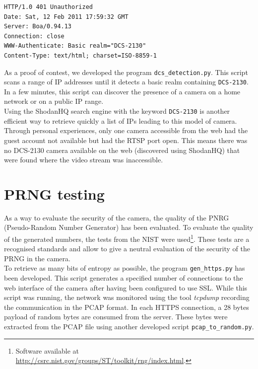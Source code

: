 \begin{verbatim}
HTTP/1.0 401 Unauthorized
Date: Sat, 12 Feb 2011 17:59:32 GMT
Server: Boa/0.94.13
Connection: close
WWW-Authenticate: Basic realm="DCS-2130"
Content-Type: text/html; charset=ISO-8859-1
\end{verbatim}

As a proof of contest, we developed the program \texttt{dcs\_detection.py}.
This script scans a range of IP addresses until it detects a basic realm containing \texttt{DCS-2130}.
In a few minutes, this script can discover the presence of a camera on a home network or on a public IP range.\\

Using the ShodanHQ search engine with the keyword \texttt{DCS-2130} is another efficient way to retrieve quickly a list of IPs leading to this model of camera.\\

Through personal experiences, only one camera accessible from the web had the guest account not available but had the RTSP port open.
This means there was no DCS-2130 camera available on the web (discovered using ShodanHQ) that were found where the video stream was inaccessible.

\section{PRNG testing}
\label{sec:dcs-random}

As a way to evaluate the security of the camera, the quality of the PNRG (Pseudo-Random Number Generator) has been evaluated.
To evaluate the quality of the generated numbers, the tests from the NIST were used\footnote{Software available at \url{http://csrc.nist.gov/groups/ST/toolkit/rng/index.html}.}.
These tests are a recognised standards and allow to give a neutral evaluation of the security of the PRNG in the camera.\\

To retrieve as many bits of entropy as possible, the program \texttt{gen\_https.py} has been developed.
This script generates a specified number of connections to the web interface of the camera after having been configured to use SSL.
While this script was running, the network was monitored using the tool \emph{tcpdump} recording the communication in the PCAP format.
In each HTTPS connection, a 28 bytes payload of random bytes are consumed from the server.
These bytes were extracted from the PCAP file using another developed script \texttt{pcap\_to\_random.py}.\\

